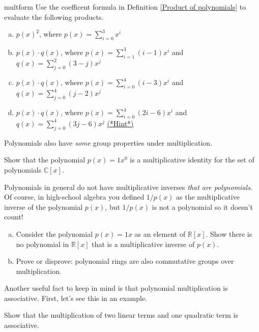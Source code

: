 \begin {exercise}{multform}
Use the coefficent formula in Definition \ref{Product of polynomials} to evaluate the following products.
\begin {enumerate}[(a)]
\item
$p(x)^2$, where $p(x) = \sum_{i=0}^{3} x^i$
\item
$p(x) \cdot q(x)$, where $p(x) = \sum_{i=1}^{3} (i-1)x^i$  and $q(x) = \sum_{j=0}^{2} (3-j)x^j$
\item
$p(x) \cdot q(x)$, where $p(x) = \sum_{i=0}^{4} (i-3)x^i$  and $q(x) = \sum_{j=0}^{4} (j-2)x^j$ 
\item
$p(x) \cdot q(x)$, where $p(x) = \sum_{i=0}^{4} (2i-6)x^i$  and $q(x) = \sum_{j=0}^{4} (3j-6)x^j$ 
\hyperref[sec:polyrings:hints]{(*Hint*)} 
\end{enumerate}
\end {exercise}


Polynomials also have \emph{some} group properties under multiplication.

\begin{exercise}
Show that the polynomial $p(x) = 1x^0$ is a multiplicative identity for the set of polynomials $\mathbb{C}[x]$.
\end{exercise}

Polynomials in general do not have multiplicative inverses \emph{that are polynomials}.  Of course, in high-school algebra you defined $1/p(x)$ as the multiplicative inverse of the polynomial $p(x)$, but $1/p(x)$ is not a polynomial so it doesn't count!

\begin{exercise}
\begin{enumerate}[(a)]
\item
Consider the  polynomial $p(x)= 1x$ as an element of $\mathbb{R}[x]$. Show there is no polynomial in $\mathbb{R}[x]$ that is a multiplicative inverse of $p(x)$.
\item
Prove or disprove: polynomial rings are also commutative groups over multiplication.
\end{enumerate}
\end{exercise}

Another useful fact to keep in mind is that polynomial multiplication is associative.  First, let's see this in an example.


\begin{exercise}
Show that the multiplication of two linear terms and one quadratic term is associative.
\end{exercise}

